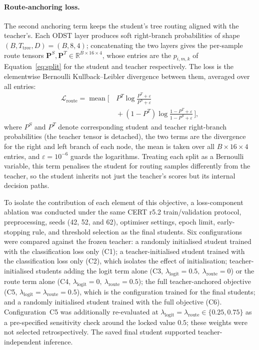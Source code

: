 \paragraph{Route-anchoring loss.}
The second anchoring term keeps the student's tree routing aligned with the
teacher's. Each ODST layer produces soft right-branch probabilities of shape
\((B,T_{\mathrm{tree}},D)=(B,8,4)\); concatenating the two layers gives the
per-sample route tensors
\(\mathbf P^{S},\mathbf P^{T}\in\mathbb R^{B\times16\times4}\), whose entries
are the \(p_{i,m,k}\) of Equation~\eqref{eq:split} for the student and
teacher respectively. The loss is the elementwise Bernoulli
Kullback--Leibler divergence between them, averaged over all entries:
\begin{equation}
\begin{split}
\mathcal L_{\mathrm{route}}
=\operatorname{mean}\Big[\,
& P^{T}\log\tfrac{P^{T}+\varepsilon}{P^{S}+\varepsilon}\\
&{}+(1-P^{T})\log\tfrac{1-P^{T}+\varepsilon}{1-P^{S}+\varepsilon}\,\Big],
\end{split}
\label{eq:route_anchor}
\end{equation}
where \(P^{S}\) and \(P^{T}\) denote corresponding student and teacher
right-branch probabilities (the teacher tensor is detached), the two terms
are the divergence for the right and left branch of each node, the mean is
taken over all \(B\times16\times4\) entries, and \(\varepsilon=10^{-6}\) guards the
logarithms. Treating each split as a Bernoulli variable, this term
penalises the student for routing samples differently from the teacher, so
the student inherits not just the teacher's scores but its internal
decision paths.

\smallskip
To isolate the contribution of each element of this objective, a
loss-component ablation was conducted under the same CERT r5.2
train/validation protocol, preprocessing, seeds (42, 52, and 62), optimiser
settings, epoch limit, early-stopping rule, and threshold selection as the
final students. Six configurations were compared against the frozen teacher:
a randomly initialised student trained with the classification loss only
(C1); a teacher-initialised student trained with the classification loss
only (C2), which isolates the effect of initialisation; teacher-initialised
students adding the logit term alone
(C3, \(\lambda_{\mathrm{logit}}=0.5,\ \lambda_{\mathrm{route}}=0\)) or the
route term alone
(C4, \(\lambda_{\mathrm{logit}}=0,\ \lambda_{\mathrm{route}}=0.5\)); the full
teacher-anchored objective
(C5, \(\lambda_{\mathrm{logit}}=\lambda_{\mathrm{route}}=0.5\)), which is the
configuration trained for the final students; and a randomly initialised
student trained with the full objective (C6). Configuration~C5 was
additionally re-evaluated at
\(\lambda_{\mathrm{logit}}=\lambda_{\mathrm{route}}\in\{0.25,0.75\}\) as a
pre-specified sensitivity check around the locked value \(0.5\); these weights
were not selected retrospectively. The saved final student supported
teacher-independent inference.

